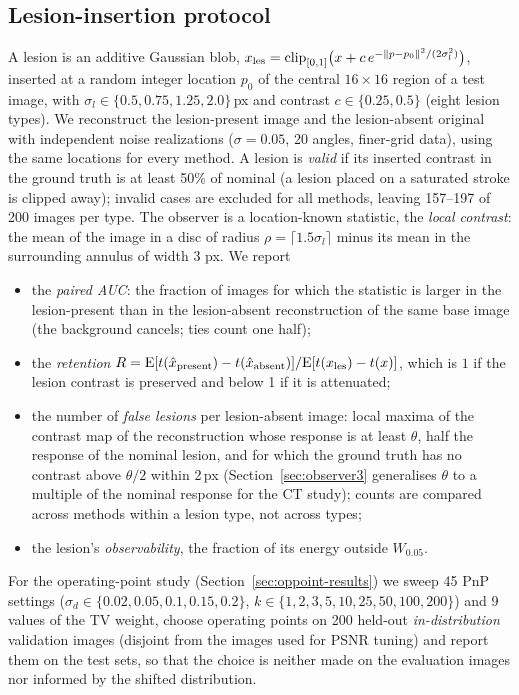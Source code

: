 \subsection{Lesion-insertion protocol}\label{sec:lesion}
A lesion is an additive Gaussian blob, $x_{\rm les}=\mathrm{clip}_{[0,1]}\bigl(x+c\,e^{-\|p-p_0\|^2/(2\sigma_l^2)}\bigr)$,
inserted at a random integer location $p_0$ of the central $16\times16$ region of a test image, with
$\sigma_l\in\{0.5,0.75,1.25,2.0\}$\,px and contrast $c\in\{0.25,0.5\}$ (eight lesion types). We reconstruct the
lesion-present image and the lesion-absent original with independent noise realizations ($\sigma=0.05$, 20 angles,
finer-grid data), using the same locations for every method. A lesion is \emph{valid} if its inserted contrast in the
ground truth is at least 50\% of nominal (a lesion placed on a saturated stroke is clipped away); invalid cases are
excluded for all methods, leaving 157--197 of 200 images per type. The observer is a location-known
statistic, the \emph{local contrast}: the mean of the image in a disc of radius $\rho=\lceil1.5\sigma_l\rceil$ minus its
mean in the surrounding annulus of width 3 px. We report
\begin{itemize}
\item the \emph{paired AUC}: the fraction of images for which the statistic is larger in the lesion-present than in the
      lesion-absent reconstruction of the same base image (the background cancels; ties count one half);
\item the \emph{retention} $R=\mathrm{E}[t(\hat x_{\rm present})-t(\hat x_{\rm absent})]/\mathrm{E}[t(x_{\rm les})-t(x)]$,
      which is $1$ if the lesion contrast is preserved and below 1 if it is attenuated;
\item the number of \emph{false lesions} per lesion-absent image: local maxima of the contrast map of the
      reconstruction whose response is at least $\theta$, half the response of the nominal lesion, and for which the
      ground truth has no contrast above $\theta/2$ within 2\,px (Section~\ref{sec:observer3} generalises $\theta$ to a
      multiple of the nominal response for the CT study); counts are compared across methods within a lesion type, not across types;
\item the lesion's \emph{observability}, the fraction of its energy outside $W_{0.05}$.
\end{itemize}
For the operating-point study (Section~\ref{sec:oppoint-results}) we sweep 45 PnP settings ($\sigma_d\in\{0.02,0.05,0.1,0.15,0.2\}$,
$k\in\{1,2,3,5,10,25,50,100,200\}$) and 9 values of the TV weight, choose operating points on 200 held-out
\emph{in-distribution} validation images (disjoint from the images used for PSNR tuning) and report them on the
test sets, so that the choice is neither made on the evaluation images nor informed by the shifted distribution.


